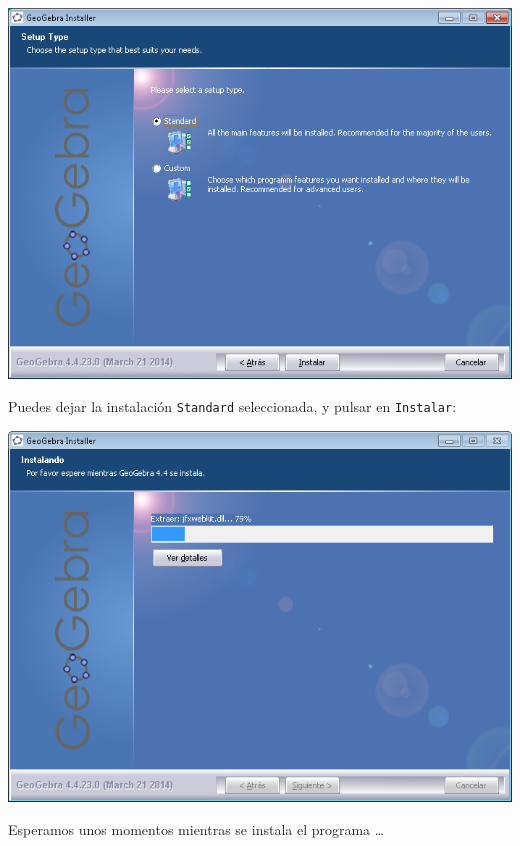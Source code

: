 \documentclass[10pt,a4paper]{article}\usepackage[]{graphicx}\usepackage[]{color}
\begin{document}
    \begin{center}
    \includegraphics[width=14cm]{../fig/Tut00-GeoGebraSetup03.png}
    \end{center}
Puedes dejar la instalación {\tt Standard} seleccionada, y pulsar en {\tt Instalar}:
    \begin{center}
    \includegraphics[width=14cm]{../fig/Tut00-GeoGebraSetup04.png}
    \end{center}
Esperamos unos momentos mientras se instala el programa \ldots
\end{document}
